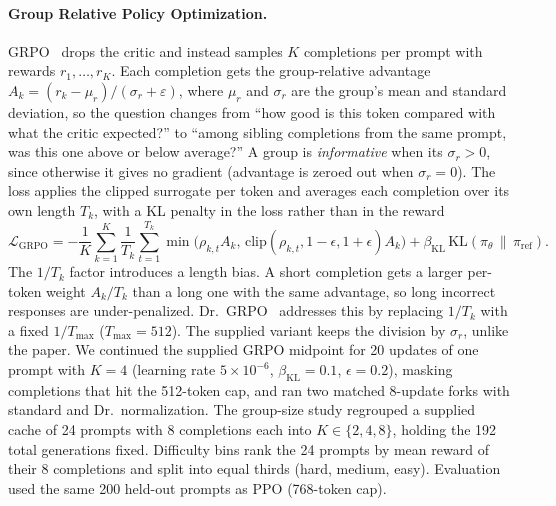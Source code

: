 \documentclass{article}
\begin{document}
\paragraph{Group Relative Policy Optimization.} GRPO~\citep{shao2024deepseekmath} drops the critic and instead samples $K$ completions per prompt with rewards $r_1, \dots, r_K$. Each completion gets the group-relative advantage $A_k = (r_k - \mu_r)/(\sigma_r + \varepsilon)$, where $\mu_r$ and $\sigma_r$ are the group's mean and standard deviation, so the question changes from ``how good is this token compared with what the critic expected?'' to ``among sibling completions from the same prompt, was this one above or below average?'' A group is \emph{informative} when its $\sigma_r > 0$, since otherwise it gives no gradient (advantage is zeroed out when $\sigma_r = 0$). The loss applies the clipped surrogate per token and averages each completion over its own length $T_k$, with a KL penalty in the loss rather than in the reward
$$
\mathcal{L}_{\text{GRPO}} = -\frac{1}{K}\sum_{k=1}^{K}\frac{1}{T_k}\sum_{t=1}^{T_k} \min\big(\rho_{k,t} A_k,\, \mathrm{clip}(\rho_{k,t}, 1{-}\epsilon, 1{+}\epsilon) A_k\big) + \beta_{\text{KL}}\, \mathrm{KL}(\pi_\theta \,\|\, \pi_{\text{ref}}).
$$
The $1/T_k$ factor introduces a length bias. A short completion gets a larger per-token weight $A_k/T_k$ than a long one with the same advantage, so long incorrect responses are under-penalized. Dr.\ GRPO~\citep{liu2025drgrpo} addresses this by replacing $1/T_k$ with a fixed $1/T_{\max}$ ($T_{\max} = 512$). The supplied variant keeps the division by $\sigma_r$, unlike the paper. We continued the supplied GRPO midpoint for 20 updates of one prompt with $K = 4$ (learning rate $5{\times}10^{-6}$, $\beta_{\text{KL}} = 0.1$, $\epsilon = 0.2$), masking completions that hit the 512-token cap, and ran two matched 8-update forks with standard and Dr.\ normalization. The group-size study regrouped a supplied cache of 24 prompts with 8 completions each into $K \in \{2, 4, 8\}$, holding the 192 total generations fixed. Difficulty bins rank the 24 prompts by mean reward of their 8 completions and split into equal thirds (hard, medium, easy). Evaluation used the same 200 held-out prompts as PPO (768-token cap).
\end{document}
